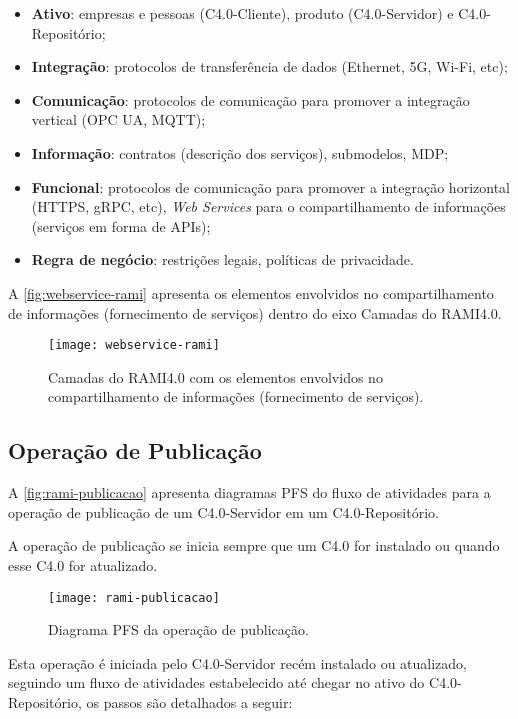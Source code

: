 \begin{itemize}
	\item \textbf{Ativo}: empresas e pessoas (C4.0-Cliente), produto (C4.0-Servidor) e C4.0-Repositório;
	\item \textbf{Integração}: protocolos de transferência de dados (Ethernet, 5G, Wi-Fi, etc);
	\item \textbf{Comunicação}: protocolos de comunicação para promover a integração vertical (OPC UA, MQTT);
	\item \textbf{Informação}: contratos (descrição dos serviços), submodelos, MDP;
	\item \textbf{Funcional}: protocolos de comunicação para promover a integração horizontal (HTTPS, gRPC, etc), \textit{Web Services} para o compartilhamento de informações (serviços em forma de APIs);
	\item \textbf{Regra de negócio}: restrições legais, políticas de privacidade.
\end{itemize}

A \autoref{fig:webservice-rami} apresenta os elementos envolvidos no compartilhamento de informações (fornecimento de serviços) dentro do eixo Camadas do RAMI4.0.

\begin{figure}[H]
	\centering
	\texttt{[image: webservice-rami]}
	\caption{Camadas do RAMI4.0 com os elementos envolvidos no compartilhamento de informações (fornecimento de serviços).}
	\label{fig:webservice-rami}
\end{figure}

\subsection{Operação de Publicação}

A \autoref{fig:rami-publicacao} apresenta diagramas PFS do fluxo de atividades para a operação de publicação de um C4.0-Servidor em um C4.0-Repositório.

A operação de publicação se inicia sempre que um C4.0 for instalado ou quando esse C4.0 for atualizado.

\begin{figure}[htb]
	\centering
	\texttt{[image: rami-publicacao]}
	\caption{Diagrama PFS da operação de publicação.}
	\label{fig:rami-publicacao}
\end{figure}

Esta operação é iniciada pelo C4.0-Servidor recém instalado ou atualizado, seguindo um fluxo de atividades estabelecido até chegar no ativo do C4.0-Repositório, os passos são detalhados a seguir:

